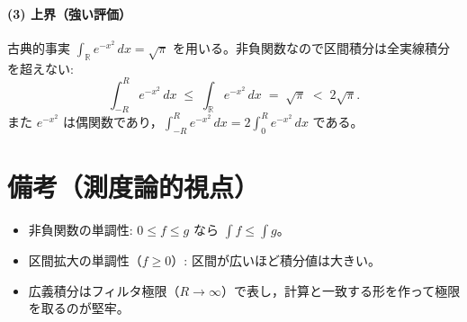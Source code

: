 \documentclass[a4paper,12pt]{jsarticle}
\newcommand{\R}{\mathbb{R}}
\begin{document}
\paragraph{(3) 上界（強い評価）} 古典的事実 $\displaystyle \int_{\R} e^{-x^2}\,dx = \sqrt{\pi}$ を用いる。非負関数なので区間積分は全実線積分を超えない:
\[
  \int_{-R}^{R} e^{-x^2}\,dx \;\le\; \int_{\R} e^{-x^2}\,dx \;=\; \sqrt{\pi} \;<\; 2\sqrt{\pi}.
\]
また $e^{-x^2}$ は偶関数であり，$\int_{-R}^{R} e^{-x^2}\,dx = 2\int_0^R e^{-x^2}\,dx$ である。

\section*{備考（測度論的視点）}
\begin{itemize}
  \item 非負関数の単調性: $0\le f\le g$ なら $\int f \le \int g$。
  \item 区間拡大の単調性（$f\ge 0$）: 区間が広いほど積分値は大きい。
  \item 広義積分はフィルタ極限（$R\to\infty$）で表し，計算と一致する形を作って極限を取るのが堅牢。
\end{itemize}
\end{document}
